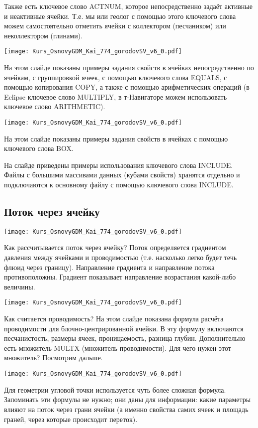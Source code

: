 \documentclass[main.tex]{subfiles}
\begin{document}
Также есть ключевое слово ACTNUM, которое непосредственно задаёт активные и неактивные ячейки. Т.е. мы или геолог с помощью этого ключевого слова можем самостоятельно отметить ячейки с коллектором (песчаником) или неколлектором (глинами).
 
\texttt{[image: Kurs\_OsnovyGDM\_Kai\_774\_gorodovSV\_v6\_0.pdf]}

На этом слайде показаны примеры задания свойств в ячейках непосредственно по ячейкам, с группировкой ячеек, с помощью ключевого слова EQUALS, с помощью копирования COPY, а также с помощью арифметических операций (в Eclipse ключевое слово MULTIPLY, в т-Навигаторе можем использовать ключевое слово ARITHMETIC).

\texttt{[image: Kurs\_OsnovyGDM\_Kai\_774\_gorodovSV\_v6\_0.pdf]}

На этом слайде показаны примеры задания свойств в ячейках с помощью ключевого слова BOX.

На слайде приведены примеры использования ключевого слова INCLUDE.
Файлы с большими массивами данных (кубами свойств) хранятся отдельно и подключаются к основному файлу с помощью ключевого слова INCLUDE.

\subsection{Поток через ячейку}

\texttt{[image: Kurs\_OsnovyGDM\_Kai\_774\_gorodovSV\_v6\_0.pdf]}

Как рассчитывается поток через ячейку?
Поток определяется градиентом давления между ячейками и проводимостью (т.е. насколько легко будет течь флюид через границу).
Направление градиента и направление потока противоположны.
Градиент показывает направление возрастания какой-либо величины.

\texttt{[image: Kurs\_OsnovyGDM\_Kai\_774\_gorodovSV\_v6\_0.pdf]}

Как считается проводимость?
На этом слайде показана формула расчёта проводимости для блочно-центрированной ячейки.
В эту формулу включаются песчанистость, размеры ячеек, проницаемость, разница глубин.
Дополнительно есть множитель MULTX (множитель проводимости).
Для чего нужен этот множитель? Посмотрим дальше.

\texttt{[image: Kurs\_OsnovyGDM\_Kai\_774\_gorodovSV\_v6\_0.pdf]}

Для геометрии угловой точки используется чуть более сложная формула.
Запоминать эти формулы не нужно; они даны для информации: какие параметры влияют на поток через грани ячейки (а именно свойства самих ячеек и площадь граней, через которые происходит переток).
\end{document}
